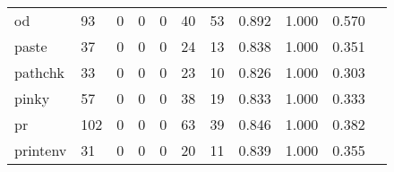 \begin{longtable}{lp{1.2cm}p{1.2cm}p{1.2cm}p{1.2cm}p{1.2cm}p{1.2cm}p{1.2cm}p{1.2cm}p{1.2cm}p{1.2cm}}
od        &                                    93 &                                                  0 &                                                  0 &                                                  0 &                                                 40 &                                                 53 &                                              0.892 &                                              1.000 &                                              0.570 \\
paste     &                                    37 &                                                  0 &                                                  0 &                                                  0 &                                                 24 &                                                 13 &                                              0.838 &                                              1.000 &                                              0.351 \\
pathchk   &                                    33 &                                                  0 &                                                  0 &                                                  0 &                                                 23 &                                                 10 &                                              0.826 &                                              1.000 &                                              0.303 \\
pinky     &                                    57 &                                                  0 &                                                  0 &                                                  0 &                                                 38 &                                                 19 &                                              0.833 &                                              1.000 &                                              0.333 \\
pr        &                                   102 &                                                  0 &                                                  0 &                                                  0 &                                                 63 &                                                 39 &                                              0.846 &                                              1.000 &                                              0.382 \\
printenv  &                                    31 &                                                  0 &                                                  0 &                                                  0 &                                                 20 &                                                 11 &                                              0.839 &                                              1.000 &                                              0.355 \\

\end{longtable}
